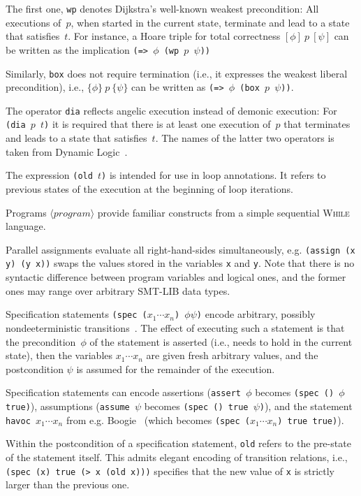 \documentclass[fleqn]{llncs}
\newcommand{\code}[1]{\texttt{#1}}
\newcommand{\hoare}[3]{\{ #1 \}~#2~\{ #3 \}}
\newcommand{\hoaretotal}[3]{[ #1 ]~#2~[ #3 ]}
\newcommand{\nonterminal}[1]{\ensuremath{\langle \mathit{#1} \rangle}}
\begin{document}
The first one, \code{wp} denotes Dijkstra's well-known weakest precondition:
All executions of~$p$, when started in the current state, terminate and lead to a state that satisfies~$t$.
For instance, a Hoare triple for total correctness $\hoaretotal{\phi}{p}{\psi}$ can be written as the implication \code{(=> $\phi$ (wp $p$ $\psi$))}

Similarly, \code{box} does not require termination (i.e., it expresses the weakest liberal precondition),
i.e., $\hoare{\phi}{p}{\psi}$ can be written as \code{(=> $\phi$ (box $p$ $\psi$))}.

The operator \code{dia} reflects angelic execution instead of demonic execution:
For \code{(dia $p$ $t$)} it is required that there is at least one execution of~$p$
that terminates and leads to a state that satisfies~$t$.
The names of the latter two operators is taken from Dynamic Logic~\cite{}.

The expression \code{(old $t$)} is intended for use in loop annotations.
It refers to previous states of the execution at the beginning of loop iterations.

\medskip

Programs \nonterminal{program} provide familiar constructs from a simple sequential \textsc{While} language.

Parallel assignments evaluate all right-hand-sides simultaneously,
e.g. \code{(assign (x y)  (y x))} swaps the values stored in the variables \code{x} and \code{y}.
Note that there is no syntactic difference between program variables and logical ones,
and the former ones may range over arbitrary SMT-LIB data types.

Specification statements \code{(spec ($x_1 \cdots x_n$) $\phi \psi$)}
encode arbitrary, possibly nondeeterministic transitions~\cite{}.
The effect of executing such a statement is that the precondition~$\phi$ of the statement
is asserted (i.e., needs to hold in the current state),
then the variables \code{$x_1 \cdots x_n$} are given fresh arbitrary values,
and the postcondition $\psi$ is assumed for the remainder of the execution.

Specification statements can encode assertions (\code{assert $\phi$} becomes \code{(spec () $\phi$ true)}),
assumptions (\code{assume $\psi$} becomes \code{(spec () true $\psi$)}),
and the statement \code{havoc $x_1 \cdots x_n$} from e.g. Boogie~\cite{}
(which becomes \code{(spec ($x_1 \cdots x_n$) true true)}).

Within the postcondition of a specification statement, \code{old} refers to the pre-state of the statement itself.
This admits elegant encoding of transition relations,
i.e., \code{(spec (x) true (> x (old x)))} specifies that the new value of \code{x} is strictly larger than the previous one.
\end{document}
